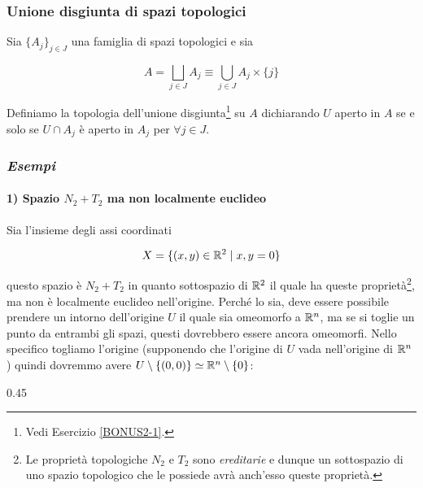 \subsubsection{Unione disgiunta di spazi topologici}

Sia $ \{A_{j}\}_{j \in J} $ una famiglia di spazi topologici e sia

\begin{equation}
		A = \bigsqcup_{j \in J} A_{j} \equiv \bigcup_{j \in J} A_{j} \times \{j\}
\end{equation}

Definiamo la topologia dell'unione disgiunta\footnote{%
	Vedi Esercizio \ref{BONUS2-1}.%
} su $ A $ dichiarando $ U $ aperto in $ A $ se e solo se $ U \cap A_{j} $ è aperto in $ A_{j} $ per $ \forall j \in J $.

\subsubsection{\textit{Esempi}}

\paragraph{1) Spazio $ N_{2} + T_{2} $ ma non localmente euclideo} 

Sia l'insieme degli assi coordinati

\begin{equation}
	X = \{ (x,y) \in \mathbb{R}^{2} \mid x,y = 0 \}
\end{equation}

questo spazio è $ N_{2} + T_{2} $ in quanto sottospazio di $ \mathbb{R}^{2} $ il quale ha queste proprietà\footnote{%
	Le proprietà topologiche $ N_{2} $ e $ T_{2} $ sono \textit{ereditarie} e dunque un sottospazio di uno spazio topologico che le possiede avrà anch'esso queste proprietà.%
}, ma non è localmente euclideo nell'origine. Perché lo sia, deve essere possibile prendere un intorno dell'origine $ U $ il quale sia omeomorfo a $ \mathbb{R}^{n} $, ma se si toglie un punto da entrambi gli spazi, questi dovrebbero essere ancora omeomorfi. Nello specifico togliamo l'origine (supponendo che l'origine di $ U $ vada nell'origine di $ \mathbb{R}^{n} $) quindi dovremmo avere $ U \setminus \{(0,0)\} \simeq \mathbb{R}^{n} \setminus \{0\} $:

	{0.45}{%
		}
	
